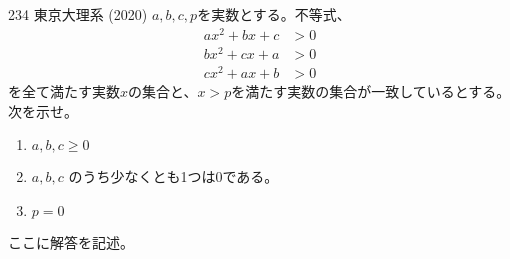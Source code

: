 \begin{thm}{234}{ \maru}{東京大理系 (2020)}
 $a, b, c, p$を実数とする。不等式、
 \begin{align*}
  ax^2+bx+c&>0 \\
  bx^2+cx+a&>0 \\
  cx^2+ax+b&>0
 \end{align*}
 を全て満たす実数$x$の集合と、$x>p$を満たす実数の集合が一致しているとする。次を示せ。
 \begin{enumerate}
  \item $a, b, c \ge 0$
  \item $a, b, c$ のうち少なくとも1つは0である。
  \item $p=0$
 \end{enumerate}
\end{thm}

ここに解答を記述。